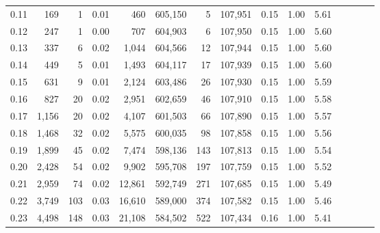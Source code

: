 \begin{tabular}{rrrcrrrrrrrrrrr}
0.11 &     169 &      1 &                                       0.01 &      460 &  605,150 &        5 &  107,951 &  0.15 &  1.00 &                         5.61 \\
0.12 &     247 &      1 &                                       0.00 &      707 &  604,903 &        6 &  107,950 &  0.15 &  1.00 &                         5.60 \\
0.13 &     337 &      6 &                                       0.02 &    1,044 &  604,566 &       12 &  107,944 &  0.15 &  1.00 &                         5.60 \\
0.14 &     449 &      5 &                                       0.01 &    1,493 &  604,117 &       17 &  107,939 &  0.15 &  1.00 &                         5.60 \\
0.15 &     631 &      9 &                                       0.01 &    2,124 &  603,486 &       26 &  107,930 &  0.15 &  1.00 &                         5.59 \\
0.16 &     827 &     20 &                                       0.02 &    2,951 &  602,659 &       46 &  107,910 &  0.15 &  1.00 &                         5.58 \\
0.17 &   1,156 &     20 &                                       0.02 &    4,107 &  601,503 &       66 &  107,890 &  0.15 &  1.00 &                         5.57 \\
0.18 &   1,468 &     32 &                                       0.02 &    5,575 &  600,035 &       98 &  107,858 &  0.15 &  1.00 &                         5.56 \\
0.19 &   1,899 &     45 &                                       0.02 &    7,474 &  598,136 &      143 &  107,813 &  0.15 &  1.00 &                         5.54 \\
0.20 &   2,428 &     54 &                                       0.02 &    9,902 &  595,708 &      197 &  107,759 &  0.15 &  1.00 &                         5.52 \\
0.21 &   2,959 &     74 &                                       0.02 &   12,861 &  592,749 &      271 &  107,685 &  0.15 &  1.00 &                         5.49 \\
0.22 &   3,749 &    103 &                                       0.03 &   16,610 &  589,000 &      374 &  107,582 &  0.15 &  1.00 &                         5.46 \\
0.23 &   4,498 &    148 &                                       0.03 &   21,108 &  584,502 &      522 &  107,434 &  0.16 &  1.00 &                         5.41 \\

\end{tabular}
